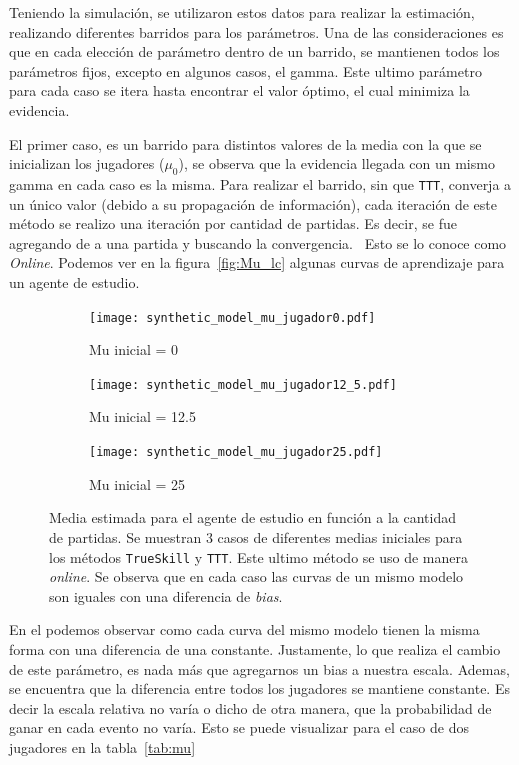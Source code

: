 \documentclass[11pt,twoside, spanish]{report} %
\begin{document}
Teniendo la simulaci\'on, se utilizaron estos datos para realizar la estimaci\'on, realizando diferentes barridos para los par\'ametros.
Una de las consideraciones es que en cada elecci\'on de par\'ametro dentro de un barrido, se mantienen todos los par\'ametros fijos,  excepto en algunos casos, el gamma.
Este ultimo par\'ametro para cada caso se itera hasta encontrar el valor \'optimo, el cual minimiza la evidencia.

El primer caso, es  un barrido para distintos valores de la media con la que se inicializan los jugadores ($\mu_0$), se observa que la evidencia llegada con un mismo gamma en cada caso es la misma. Para realizar el barrido, sin que \texttt{TTT}, converja a un \'unico valor (debido a su propagaci\'on de informaci\'on), cada iteraci\'on de este m\'etodo se realizo una iteraci\'on por cantidad de partidas.
Es decir, se fue agregando de a una partida y buscando la convergencia. \
Esto se lo conoce como \textit{Online}.
Podemos ver en la figura~\ref{fig:Mu_lc} algunas curvas de aprendizaje para un agente de estudio.

\begin{figure}[H]
  \begin{subfigure}{0.33\textwidth}
    \texttt{[image: synthetic\_model\_mu\_jugador0.pdf]}
    \caption{Mu inicial = 0}
    \label{fig:Mu_jugador0}
  \end{subfigure}%
  \hfill
  \begin{subfigure}{0.33\textwidth}
    \texttt{[image: synthetic\_model\_mu\_jugador12\_5.pdf]}
    \caption{Mu inicial = 12.5}
    \label{fig:Mu_jugador12_5}
  \end{subfigure}%
  \hfill
  \begin{subfigure}{0.33\textwidth}
    \texttt{[image: synthetic\_model\_mu\_jugador25.pdf]}
    \caption{Mu inicial = 25}
    \label{fig:Mu_jugador25}
  \end{subfigure}
  \caption{Media estimada para el agente de estudio en funci\'on a la cantidad de partidas.	Se muestran 3 casos de diferentes medias iniciales para los m\'etodos \texttt{TrueSkill} y \texttt{TTT}.	Este ultimo m\'etodo se uso de manera \textit{online}. Se observa que en cada caso las curvas de un mismo modelo son iguales con una diferencia de \emph{bias}.}
\end{figure}


En el podemos observar como cada curva del mismo modelo tienen la misma forma con una diferencia de una constante.
Justamente, lo que realiza el cambio de este par\'ametro, es nada m\'as que agregarnos un bias a nuestra escala.
Ademas, se encuentra que la diferencia entre todos los jugadores se mantiene constante.
Es decir la escala relativa no var\'ia o dicho de otra manera, que la probabilidad de ganar en cada evento no var\'ia.
Esto se puede visualizar para el caso de dos jugadores en la tabla~\ref{tab:mu}
\end{document}
